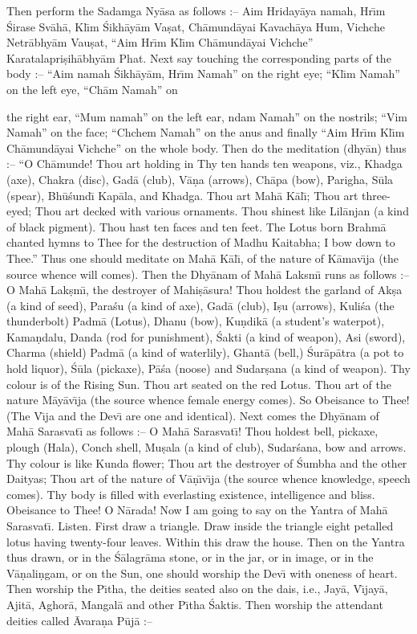 Then perform the Sadamga Ny\=asa as follows :-- Aim Hriday\=aya namah, Hr\={\i}m \'Sirase Sv\=ah\=a, Kl\={\i}m \'Sikh\=ay\=am Va\d{s}at, Ch\=amund\=ayai Kavach\=aya Hum, Vichche Netr\=abhy\=am Vau\d{s}at, ``Aim Hr\={\i}m Kl\={\i}m Ch\=amund\=ayai Vichche'' Karatalapri\d{s}ih\=abhy\=am Phat. Next say touching the corresponding parts of the body :-- ``Aim namah \'Sikh\=ay\=am, Hr\={\i}m Namah'' on the right eye; ``Kl\={\i}m Namah'' on the left eye, ``Ch\=am Namah'' on

the right ear, ``Mum namah'' on the left ear, ndam Namah'' on the nostrils; ``Vim Namah'' on the face; ``Chchem Namah'' on the anus and finally ``Aim Hr\={\i}m Kl\={\i}m Ch\=amund\=ayai Vichche'' on the whole body. Then do the meditation (dhy\=an) thus :-- ``O Ch\=amunde! Thou art holding in Thy ten hands ten weapons, viz., Khadga (axe), Chakra (disc), Gad\=a (club), V\=a\d{n}a (arrows), Ch\=apa (bow), Parigha, S\=ula (spear), Bh\=u\'sund\={\i} Kap\=ala, and Khadga. Thou art Mah\=a K\=al\={\i}; Thou art three-eyed; Thou art decked with various ornaments. Thou shinest like Lil\=anjan (a kind of black pigment). Thou hast ten faces and ten feet. The Lotus born Brahm\=a chanted hymns to Thee for the destruction of Madhu Kaitabha; I bow down to Thee.'' Thus one should meditate on Mah\=a K\=al\={\i}, of the nature of K\=amav\={\i}ja (the source whence will comes). Then the Dhy\=anam of Mah\=a Laksm\={\i} runs as follows :-- O Mah\=a Lak\d{s}m\={\i}, the destroyer of Mahi\d{s}\=asura! Thou holdest the garland of Ak\d{s}a (a kind of seed), Para\'su (a kind of axe), Gad\=a (club), I\d{s}u (arrows), Kuli\'sa (the thunderbolt) Padm\=a (Lotus), Dhanu (bow), Ku\d{n}dik\=a (a student's waterpot), Kama\d{n}dalu, Danda (rod for punishment), \'Sakti (a kind of weapon), Asi (sword), Charma (shield) Padm\=a (a kind of waterlily), Ghant\=a (bell,) \'Sur\=ap\=atra (a pot to hold liquor), \'S\=ula (pickaxe), P\=a\'sa (noose) and Sudar\d{s}ana (a kind of weapon). Thy colour is of the Rising Sun. Thou art seated on the red Lotus. Thou art of the nature M\=ay\=av\={\i}ja (the source whence female energy comes). So Obeisance to Thee! (The V\={\i}ja and the Dev\={\i} are one and identical). Next comes the Dhy\=anam of Mah\=a Sarasvat\={\i} as follows :-- O Mah\=a Sarasvat\={\i}! Thou holdest bell, pickaxe, plough (Hala), Conch shell, Mu\d{s}ala (a kind of club), Sudar\'sana, bow and arrows. Thy colour is like Kunda flower; Thou art the destroyer of \'Sumbha and the other Daityas; Thou art of the nature of V\=a\d{n}\={\i}v\={\i}ja (the source whence knowledge, speech comes). Thy body is filled with everlasting existence, intelligence and bliss. Obeisance to Thee! O N\=arada! Now I am going to say on the Yantra of Mah\=a Sarasvat\={\i}. Listen. First draw a triangle. Draw inside the triangle eight petalled lotus having twenty-four leaves. Within this draw the house. Then on the Yantra thus drawn, or in the \'S\=alagr\=ama stone, or in the jar, or in image, or in the V\=a\d{n}ali\d{n}gam, or on the Sun, one should worship the Dev\={\i} with oneness of heart. Then worship the P\={\i}tha, the deities seated also on the dais, i.e., Jay\=a, V\={\i}jay\=a, Ajit\=a, Aghor\=a, Mangal\=a and other P\={\i}tha \'Saktis. Then worship the attendant deities called \=Avara\d{n}a P\=uj\=a :-- 